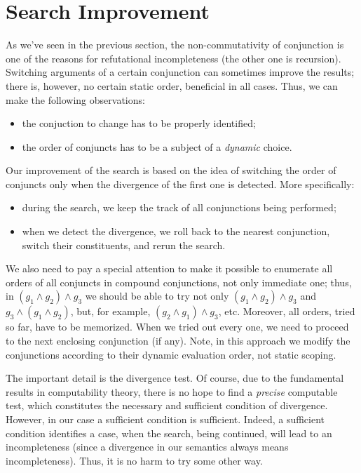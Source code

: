 \section{Search Improvement}
\label{improvement}

As we've seen in the previous section, the non-commutativity of conjunction is one of the reasons for
refutational incompleteness (the other one is recursion). Switching arguments of a certain conjunction
can sometimes improve the results; there is, however, no certain static order,
beneficial in all cases. Thus, we can make the following observations:

\begin{itemize}
\item the conjuction to change has to be properly identified;
\item the order of conjuncts has to be a subject of a \emph{dynamic} choice.
\end{itemize}

Our improvement of the search is based on the idea of switching the order of conjuncts only when
the divergence of the first one is detected. More specifically: 

\begin{itemize}
\item during the search, we keep the track of all conjunctions being performed;
\item when we detect the divergence, we roll back to the nearest conjunction, switch their
constituents, and rerun the search.
\end{itemize}

We also need to pay a special attention to make it possible to enumerate all orders of all conjuncts in
compound conjunctions, not only immediate one; thus, in \mbox{$(g_1\wedge g_2)\wedge g_3$} we should
be able to try not only \mbox{$(g_1\wedge g_2)\wedge g_3$} and \mbox{$g_3 \wedge(g_1\wedge g_2)$}, but, 
for example, \mbox{$(g_2\wedge g_1)\wedge g_3$}, etc. Moreover, all orders, tried so far, have to be
memorized. When we tried out every one, we need to proceed to the next enclosing conjunction (if any).
Note, in this approach we modify the conjunctions according to their dynamic evaluation order, not static
scoping. 

The important detail is the divergence test. Of course, due to the fundamental results in computability
theory, there is no hope to find a \emph{precise} computable test, which constitutes the necessary and 
sufficient condition of divergence. However, in our case a sufficient condition is sufficient. Indeed,  
a sufficient condition identifies a case, when the search, being continued, will lead to an incompleteness 
(since a divergence in our semantics always means incompleteness). Thus, it is no harm to try some other way. 

